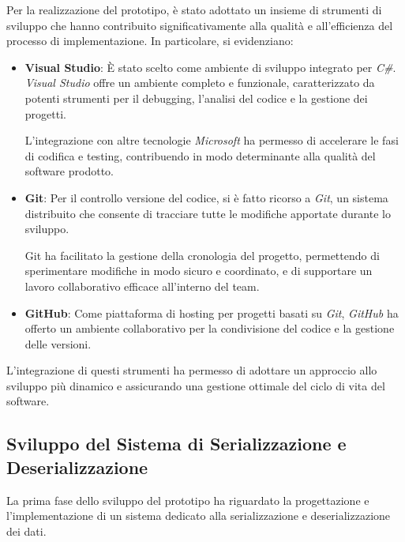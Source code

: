 \documentclass[12pt,a4paper,openright,twoside]{book}
\begin{document}
            Per la realizzazione del prototipo, è stato adottato un insieme di strumenti di sviluppo che hanno contribuito significativamente alla qualità e all’efficienza del processo di implementazione. In particolare, si evidenziano:

            \begin{itemize}
                \item \textbf{Visual Studio}: È stato scelto come ambiente di sviluppo integrato per \textit{C\#}. \textit{Visual Studio} offre un ambiente completo e funzionale, caratterizzato da potenti strumenti per il debugging, l’analisi del codice e la gestione dei progetti.

                L’integrazione con altre tecnologie \textit{Microsoft} ha permesso di accelerare le fasi di codifica e testing, contribuendo in modo determinante alla qualità del software prodotto.

                \pagebreak

                \item \textbf{Git}: Per il controllo versione del codice, si è fatto ricorso a \textit{Git}, un sistema distribuito che consente di tracciare tutte le modifiche apportate durante lo sviluppo.

                Git ha facilitato la gestione della cronologia del progetto, permettendo di sperimentare modifiche in modo sicuro e coordinato, e di supportare un lavoro collaborativo efficace all'interno del team.

                \item \textbf{GitHub}: Come piattaforma di hosting per progetti basati su \textit{Git}, \textit{GitHub} ha offerto un ambiente collaborativo per la condivisione del codice e la gestione delle versioni.
            \end{itemize}

            L'integrazione di questi strumenti ha permesso di adottare un approccio allo sviluppo più dinamico e assicurando una gestione ottimale del ciclo di vita del software.

        \subsection{Sviluppo del Sistema di Serializzazione e Deserializzazione}

            La prima fase dello sviluppo del prototipo ha riguardato la progettazione e l’implementazione di un sistema dedicato alla serializzazione e deserializzazione dei dati.
\end{document}
